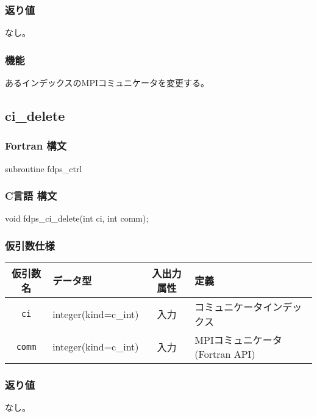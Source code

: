 \subsubsection*{返り値}
なし。

\subsubsection*{機能}
あるインデックスのMPIコミュニケータを変更する。

\subsection{ci\_delete}
\subsubsection*{Fortran 構文}
\begin{screen}
\begin{spverbatim}
subroutine fdps_ctrl%
\end{spverbatim}
\end{screen}

\subsubsection*{C言語 構文}
\begin{screen}
\begin{spverbatim}
void fdps_ci_delete(int ci, int comm);
\end{spverbatim}
\end{screen}

\subsubsection*{仮引数仕様}
\begin{table}[h]
\begin{tabularx}{\linewidth}{cXcX}
\toprule
\rowcolor{Snow2}
仮引数名 & データ型 & 入出力属性 & 定義 \\
\midrule
\verb|ci| & integer(kind=c\_int) & 入力 & コミュニケータインデックス\\
\verb|comm| & integer(kind=c\_int) & 入力 & MPIコミュニケータ(Fortran API)\\
\bottomrule
\end{tabularx}
\end{table}


\subsubsection*{返り値}
なし。

